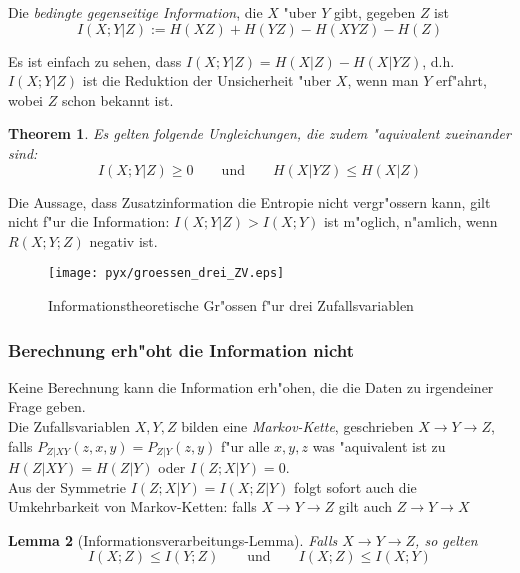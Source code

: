 \documentclass[german, 10pt, a4paper, twocolumn]{scrartcl}
\newtheorem{theorem}{Theorem}
\newtheorem{lemma}[theorem]{Lemma}
\begin{document}
Die \textit{bedingte gegenseitige Information}, die $X$ "uber $Y$ gibt, gegeben $Z$ ist
\begin{displaymath}
	I(X;Y|Z) := H(XZ) + H(YZ) - H(XYZ)- H(Z)
\end{displaymath}

Es ist einfach zu sehen, dass $I(X;Y|Z) = H(X|Z) - H(X|YZ)$, d.h. $I(X;Y|Z)$ ist die Reduktion der Unsicherheit "uber $X$, wenn man $Y$ erf"ahrt, wobei $Z$ schon bekannt ist.

\begin{theorem}
	Es gelten folgende Ungleichungen, die zudem "aquivalent zueinander sind:
	\begin{displaymath}
		I(X;Y|Z) \geq 0 \qquad \mbox{und} \qquad H(X|YZ) \leq H(X|Z)
	\end{displaymath}
\end{theorem}

Die Aussage, dass Zusatzinformation die Entropie nicht vergr"ossern kann, gilt nicht f"ur die Information: $I(X;Y|Z)>I(X;Y)$ ist m"oglich, n"amlich, wenn $R(X;Y;Z)$ negativ ist.

\begin{figure}[hbt]
	\begin{center}
		\texttt{[image: pyx/groessen\_drei\_ZV.eps]}
	\end{center}
	\label{groessen_drei_ZV}
	\caption{Informationstheoretische Gr"ossen f"ur drei Zufallsvariablen}
\end{figure}

\subsubsection{Berechnung erh"oht die Information nicht}

Keine Berechnung kann die Information erh"ohen, die die Daten zu irgendeiner Frage geben.\\


Die Zufallsvariablen $X, Y, Z$ bilden eine \textit{Markov-Kette}, geschrieben $X \rightarrow Y \rightarrow Z$, falls $P_{Z|XY}(z,x,y)=P_{Z|Y}(z,y)$ f"ur alle $x,y,z$ was "aquivalent ist zu $H(Z|XY) = H(Z|Y)$ oder $I(Z;X|Y) = 0$.\\
Aus der Symmetrie $I(Z;X|Y)= I(X;Z|Y)$ folgt sofort auch die Umkehrbarkeit von Markov-Ketten: falls $X\rightarrow Y \rightarrow Z$ gilt auch $Z\rightarrow Y \rightarrow X$

\begin{lemma}[Informationsverarbeitungs-Lemma]
	Falls $X \rightarrow Y \rightarrow Z$, so gelten
	\begin{displaymath}
		I(X;Z) \leq I(Y;Z) \qquad \mbox{und} \qquad I(X;Z) \leq I(X;Y)
	\end{displaymath}
\end{lemma}
\end{document}
